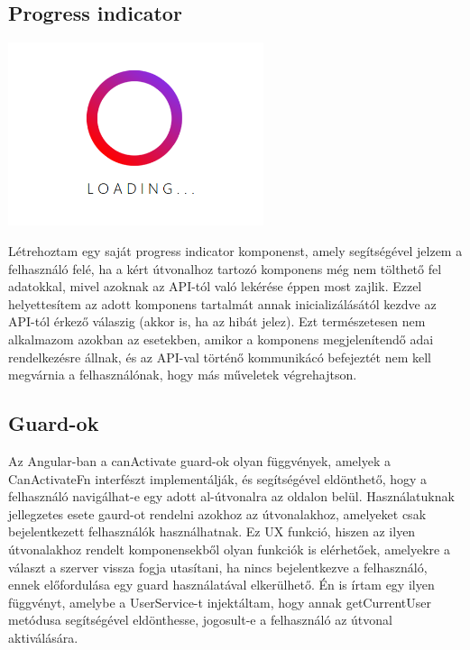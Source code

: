 \documentclass[a4paper,12pt]{report}
\theoremstyle{definition}
\theoremstyle{remark}
\begin{document}
	\subsection{Progress indicator}

\begin{center}
\includegraphics[width=75mm]{progress_indicator}
\captionsetup{width=0.8\linewidth}
\end{center}

Létrehoztam egy saját progress indicator komponenst, amely segítségével jelzem a felhasználó felé, ha a kért útvonalhoz tartozó komponens még nem tölthető fel adatokkal, mivel azoknak az API-tól való lekérése éppen most zajlik. Ezzel helyettesítem az adott komponens tartalmát annak inicializálásától kezdve az API-tól érkező válaszig (akkor is, ha az hibát jelez). Ezt természetesen nem alkalmazom azokban az esetekben, amikor a komponens megjelenítendő adai rendelkezésre állnak, és az API-val történő kommunikácó befejeztét nem kell megvárnia a felhasználónak, hogy más műveletek végrehajtson.

	\subsection{Guard-ok}

Az Angular-ban a canActivate guard-ok olyan függvények, amelyek a CanActivateFn\cite{Guardwebsite} interfészt implementálják, és segítségével eldönthető, hogy a felhasználó navigálhat-e egy adott al-útvonalra az oldalon belül. Használatuknak jellegzetes esete gaurd-ot rendelni azokhoz az útvonalakhoz, amelyeket csak bejelentkezett felhasználók használhatnak. Ez UX funkció, hiszen az ilyen útvonalakhoz rendelt komponensekből olyan funkciók is elérhetőek, amelyekre a választ a szerver vissza fogja utasítani, ha nincs bejelentkezve a felhasználó, ennek előfordulása egy guard használatával elkerülhető. Én is írtam egy ilyen függvényt, amelybe a UserService-t injektáltam, hogy annak getCurrentUser metódusa segítségével eldönthesse, jogosult-e a felhasználó az útvonal aktiválására.
\end{document}
